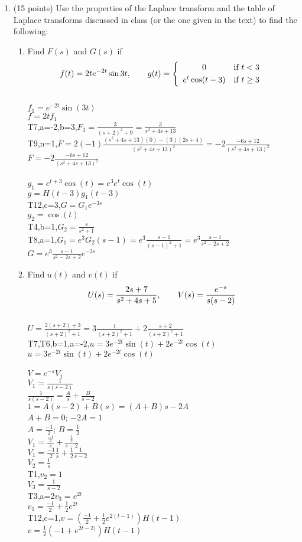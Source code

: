 \documentclass{article}
\begin{document}
\begin{enumerate}

\item (15 points)  Use the properties of the Laplace transform and the table of Laplace transforms discussed in class (or the one given in the text) to find the following:
\begin{enumerate}
\item
Find $F(s)$ and $G(s)$ if
\[
f(t)=2te\sp{-2t}\sin3t,\qquad g(t)=\left\{\begin{array}{cl} 0 & \hbox{if $t<3$}\smallskip\\ e\sp{t}\cos(t-3) & \hbox{if $t\ge3$}\end{array}\right.
\]
\\$f_1=e^{-2t}\sin(3t)$
\\$f=2tf_1$
\\T7,a=-2,b=3,$F_1=\frac{3}{(s+2)^2+9}=\frac{3}{s^2+4s+13}$
\\T9,n=1,$F=2(-1)\frac{(s^2+4s+13)(0)-(3)(2s+4)}{(s^2+4s+13)^2}=-2\frac{-6s+12}{(s^2+4s+13)^2}$
\\$F=-2\frac{-6s+12}{(s^2+4s+13)^2}$
\\
\\$g_1=e^{t+3}\cos(t)=e^3e^t\cos(t)$
\\$g=H(t-3)g_1(t-3)$
\\T12,c=3,$G=G_1e^{-3s}$
\\$g_2=\cos(t)$
\\T4,b=1,$G_2=\frac{s}{s^2+1}$
\\T8,a=1,$G_1=e^3G_2(s-1)=e^3\frac{s-1}{(s-1)^2+1}=e^3\frac{s-1}{s^2-2s+2}$
\\$G=e^3\frac{s-1}{s^2-2s+2}e^{-3s}$
\item
Find $u(t)$ and $v(t)$ if
\[
U(s)={2s+7\over s\sp2+4s+5},\qquad V(s)={e\sp{-s}\over s(s-2)}
\]
\\$U=\frac{2(s+2)+3}{(s+2)^2+1}=3\frac{1}{(s+2)^2+1}+2\frac{s+2}{(s+2)^2+1}$
\\T7,T6,b=1,a=-2,$u=3e^{-2t}\sin(t)+2e^{-2t}\cos(t)$
\\$u=3e^{-2t}\sin(t)+2e^{-2t}\cos(t)$
\\
\\$V=e^{-s}V_1$
\\$V_1=\frac{1}{s(s-2)}$
\\$\frac{1}{s(s-2)}=\frac{A}{s}+\frac{B}{s-2}$
\\$1=A(s-2)+B(s)=(A+B)s-2A$
\\$A+B=0$; $-2A=1$
\\$A=\frac{-1}{2}$; $B=\frac{1}{2}$
\\$V_1=\frac{\frac{-1}{2}}{s}+\frac{\frac{1}{2}}{s-2}$
\\$V_1=\frac{-1}{2}\frac{1}{s}+\frac{1}{2}\frac{1}{s-2}$
\\$V_2=\frac{1}{s}$
\\T1,$v_2=1$
\\$V_3=\frac{1}{s-2}$
\\T3,a=2$v_3=e^{2t}$
\\$v_1=\frac{-1}{2}+\frac{1}{2}e^{2t}$
\\T12,c=1,$v=(\frac{-1}{2}+\frac{1}{2}e^{2(t-1)})H(t-1)$
$v=\frac{1}{2}(-1+e^{2t-2)})H(t-1)$


\end{enumerate}
\end{enumerate}
\end{document}
